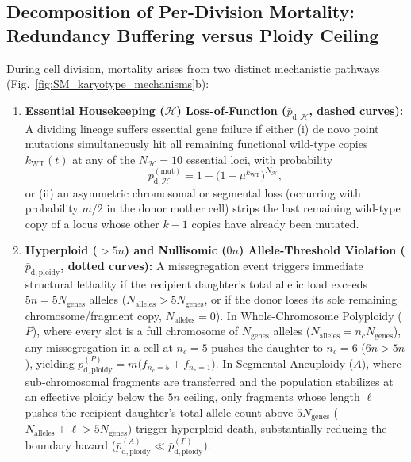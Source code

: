 \documentclass[11pt,a4paper]{article}
\begin{document}
\subsection{Decomposition of Per-Division Mortality: Redundancy Buffering versus Ploidy Ceiling}
During cell division, mortality arises from two distinct mechanistic pathways (Fig.~\ref{fig:SM_karyotype_mechanisms}b):
\begin{enumerate}
    \item \textbf{Essential Housekeeping ($\mathcal{H}$) Loss-of-Function ($\bar{p}_{\mathrm{d},\mathcal{H}}$, dashed curves):} A dividing lineage suffers essential gene failure if either (i) de novo point mutations simultaneously hit all remaining functional wild-type copies $k_{\mathrm{WT}}(t)$ at any of the $N_{\mathcal{H}} = 10$ essential loci, with probability
    \begin{equation}
        p_{\mathrm{d},\mathcal{H}}^{(\mathrm{mut})} = 1 - \bigl(1 - \mu^{k_{\mathrm{WT}}}\bigr)^{N_{\mathcal{H}}},
    \end{equation}
    or (ii) an asymmetric chromosomal or segmental loss (occurring with probability $m/2$ in the donor mother cell) strips the last remaining wild-type copy of a locus whose other $k - 1$ copies have already been mutated.
    \item \textbf{Hyperploid ($>5n$) and Nullisomic ($0n$) Allele-Threshold Violation ($\bar{p}_{\mathrm{d},\mathrm{ploidy}}$, dotted curves):} A missegregation event triggers immediate structural lethality if the recipient daughter's total allelic load exceeds $5n = 5 N_{\text{genes}}$ alleles ($N_{\text{alleles}} > 5 N_{\text{genes}}$, or if the donor loses its sole remaining chromosome/fragment copy, $N_{\text{alleles}} = 0$). In Whole-Chromosome Polyploidy ($P$), where every slot is a full chromosome of $N_{\text{genes}}$ alleles ($N_{\text{alleles}} = n_c N_{\text{genes}}$), any missegregation in a cell at $n_c = 5$ pushes the daughter to $n_c = 6$ ($6n > 5n$), yielding $\bar{p}_{\mathrm{d},\mathrm{ploidy}}^{(P)} = m \bigl(f_{n_c=5} + f_{n_c=1}\bigr)$. In Segmental Aneuploidy ($A$), where sub-chromosomal fragments are transferred and the population stabilizes at an effective ploidy below the $5n$ ceiling, only fragments whose length $\ell$ pushes the recipient daughter's total allele count above $5 N_{\text{genes}}$ ($N_{\text{alleles}} + \ell > 5 N_{\text{genes}}$) trigger hyperploid death, substantially reducing the boundary hazard ($\bar{p}_{\mathrm{d},\mathrm{ploidy}}^{(A)} \ll \bar{p}_{\mathrm{d},\mathrm{ploidy}}^{(P)}$).
\end{enumerate}
\end{document}
